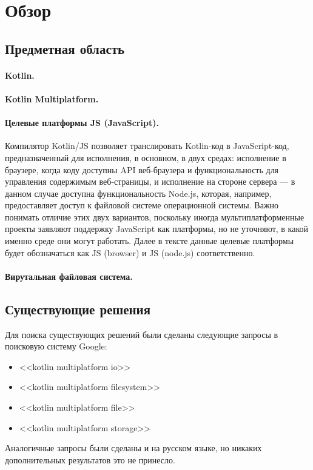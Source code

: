 \section{Обзор}\label{overview}

\subsection{Предметная область}

    \paragraph{Kotlin.} \todo{}

    \paragraph{Kotlin Multiplatform\cite{kotlin-multiplatform}.} \todo{}

    \paragraph{Целевые платформы JS (JavaScript).} Компилятор Kotlin/JS\cite{kotlin-js} позволяет транслировать Kotlin-код в JavaScript-код, предназначенный для исполнения, в основном, в двух средах: исполнение в браузере, когда коду доступны API веб-браузера и функциональность для управления содержимым веб-страницы, и исполнение на стороне сервера --- в данном случае доступна функциональность Node.js, которая, например, предоставляет доступ к файловой системе операционной системы\cite{nodejs-browser-diff}. Важно понимать отличие этих двух вариантов, поскольку иногда мультиплатформенные проекты заявляют поддержку JavaScript как платформы, но не уточняют, в какой именно среде они могут работать. Далее в тексте данные целевые платформы будет обозначаться как JS (browser) и JS (node.js) соответственно.

    \paragraph{Вирутальная файловая система.} \todo{}

\subsection{Существующие решения}
    Для поиска существующих решений были сделаны следующие запросы в поисковую систему Google:
    \begin{itemize}
        \item <<kotlin multiplatform io>>
        \item <<kotlin multiplatform filesystem>>
        \item <<kotlin multiplatform file>>
        \item <<kotlin multiplatform storage>>
    \end{itemize}
    Аналогичные запросы были сделаны и на русском языке, но никаких дополнительных результатов это не принесло.

